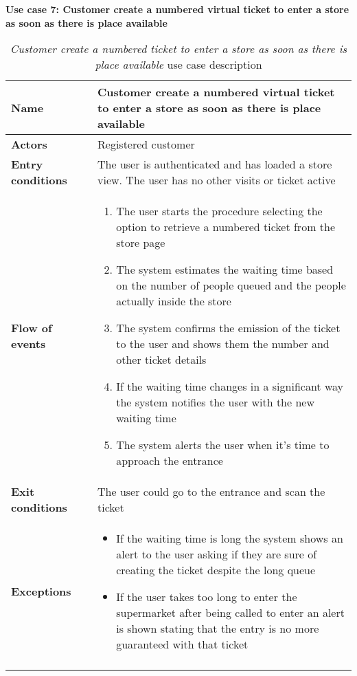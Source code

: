     \clearpage
    \textbf{Use case 7: Customer create a numbered virtual ticket to enter a store as soon as there is place available}
    \smallskip
    \begin{longtable}{p{0.25\linewidth}p{0.75\linewidth}}
    \toprule
    \textbf{Name} & \textbf{Customer create a numbered virtual ticket to enter a store as soon as there is place available} \\
    \midrule
    \textbf{Actors} & Registered customer \\
    \midrule
    \textbf{Entry conditions} & The user is authenticated and has loaded a store view. The user has no other visits or ticket active \\
    \midrule
    \textbf{Flow of events} & 
    \begin{enumerate}
        \item The user starts the procedure selecting the option to retrieve a numbered ticket from the store page
        \item The system estimates the waiting time based on the number of people queued and the people actually inside the store
        \item The system confirms the emission of the ticket to the user and shows them the number and other ticket details
        \item If the waiting time changes in a significant way the system notifies the user with the new waiting time
        \item The system alerts the user when it's time to approach the entrance
    \end{enumerate} \\
    \midrule
    \textbf{Exit conditions} & The user could go to the entrance and scan the ticket\\
    \midrule
    \textbf{Exceptions} &
    \begin{itemize}
        \item If the waiting time is long the system shows an alert to the user asking if they are sure of creating the ticket despite the long queue
        \item If the user takes too long to enter the supermarket after being called to enter an alert is shown stating that the entry is no more guaranteed with that ticket
        
    \end{itemize} \\
    \bottomrule 
    \caption{\emph{Customer create a numbered ticket to enter a store as soon as there is place available} use case description}
    \end{longtable}


